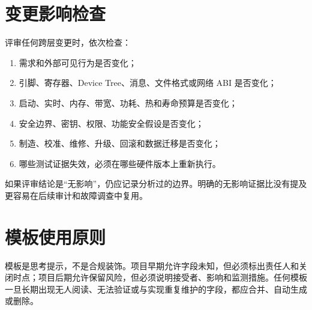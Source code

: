 \section{变更影响检查}

评审任何跨层变更时，依次检查：
\begin{enumerate}
  \item 需求和外部可见行为是否变化；
  \item 引脚、寄存器、Device Tree、消息、文件格式或网络 ABI 是否变化；
  \item 启动、实时、内存、带宽、功耗、热和寿命预算是否变化；
  \item 安全边界、密钥、权限、功能安全假设是否变化；
  \item 制造、校准、维修、升级、回滚和数据迁移是否变化；
  \item 哪些测试证据失效，必须在哪些硬件版本上重新执行。
\end{enumerate}

如果评审结论是“无影响”，仍应记录分析过的边界。明确的无影响证据比没有提及更容易在后续审计和故障调查中复用。

\section{模板使用原则}

模板是思考提示，不是合规装饰。项目早期允许字段未知，但必须标出责任人和关闭时点；项目后期允许保留风险，但必须说明接受者、影响和监测措施。任何模板一旦长期出现无人阅读、无法验证或与实现重复维护的字段，都应合并、自动生成或删除。
